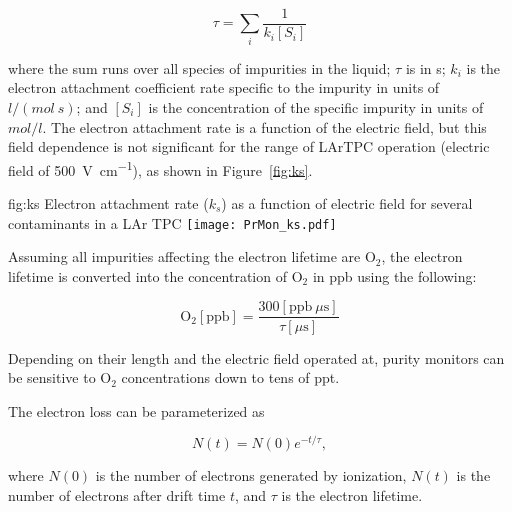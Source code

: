 $$\tau = \sum_i \frac{1}{k_i [S_i]}$$

where the sum runs over all species of impurities in the liquid; $\tau$ is in s; $k_i$ is the electron attachment coefficient rate specific to the impurity in units of $l/(mol~s)$; and $[S_i]$ is the concentration of the specific impurity in units of $mol/l$. The electron attachment rate is a function of the electric field, but this field dependence is not significant for the range of LArTPC operation (electric field of \SI{500}{\volt\per\centi\meter}), as shown in Figure~\ref{fig:ks}. 

\begin{dunefigure}{fig:ks}
  {Electron attachment rate ($k_s$) as a function of electric field for several contaminants in a LAr TPC\cite{docdb-4482}}
  \texttt{[image: PrMon\_ks.pdf]}%
\end{dunefigure}

Assuming all impurities affecting the electron lifetime are $\text{O}_2$, the electron lifetime is converted into the concentration of $\text{O}_2$ in \si{ppb} using the following:

$$ \text{O}_2 [\text{ppb}] = \frac{300 [\text{ppb}~\mu \text{s}]}{\tau [\mu \text{s}]}$$

Depending on their length and the electric field operated at, purity monitors can be sensitive to $\text{O}_2$ concentrations down to tens of \si{ppt}. 

The electron loss can be parameterized as

$$N(t) = N(0)e^{-t/\tau},$$

where $N(0)$ is the number of electrons generated by ionization, $N(t)$ is the number of electrons after drift time $t$, and $\tau$ is the electron lifetime. 


